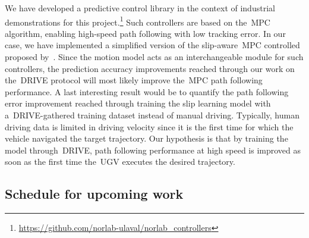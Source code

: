 \documentclass[12pt,letterpaper,oneside]{article}
\begin{document}

We have developed a predictive control library in the context of industrial demonstrations for this project.\footnote{\url{https://github.com/norlab-ulaval/norlab_controllers}}
Such controllers are based on the~\ac{MPC} algorithm, enabling high-speed path following with low tracking error.
In our case, we have implemented a simplified version of the slip-aware~\ac{MPC} controlled proposed by~\citet{Hewing2020}.
Since the motion model acts as an interchangeable module for such controllers, the prediction accuracy improvements reached through our work on the~\ac{DRIVE} protocol will most likely improve the~\ac{MPC} path following performance.
A last interesting result would be to quantify the path following error improvement reached through training the slip learning model with a~\ac{DRIVE}-gathered training dataset instead of manual driving.
Typically, human driving data is limited in driving velocity since it is the first time for which the vehicle navigated the target trajectory.
Our hypothesis is that by training the model through~\ac{DRIVE}, path following performance at high speed is improved as soon as the first time the~\ac{UGV} executes the desired trajectory.

\subsection{Schedule for upcoming work}
\label{sec:schedule}
\end{document}
